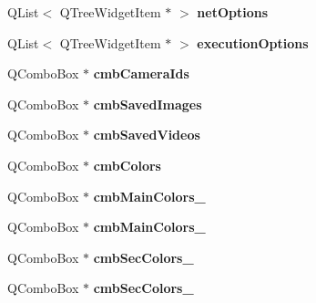 \begin{DoxyCompactItemize}
\item 
Q\+List$<$ Q\+Tree\+Widget\+Item $\ast$ $>$ {\bfseries net\+Options}\hypertarget{classMainWindow_abe03fbb5ec71af5ebe78e6d350ff8610}{}\label{classMainWindow_abe03fbb5ec71af5ebe78e6d350ff8610}

\item 
Q\+List$<$ Q\+Tree\+Widget\+Item $\ast$ $>$ {\bfseries execution\+Options}\hypertarget{classMainWindow_a07d591054dc439139f26228f13e08d16}{}\label{classMainWindow_a07d591054dc439139f26228f13e08d16}

\item 
Q\+Combo\+Box $\ast$ {\bfseries cmb\+Camera\+Ids}\hypertarget{classMainWindow_ab31fbf0f301d3b11b4f37acd22acae75}{}\label{classMainWindow_ab31fbf0f301d3b11b4f37acd22acae75}

\item 
Q\+Combo\+Box $\ast$ {\bfseries cmb\+Saved\+Images}\hypertarget{classMainWindow_a96ee34d39e2d213432dc10d7ebd451c4}{}\label{classMainWindow_a96ee34d39e2d213432dc10d7ebd451c4}

\item 
Q\+Combo\+Box $\ast$ {\bfseries cmb\+Saved\+Videos}\hypertarget{classMainWindow_a6b6645cb888879737675c47a5b1ef369}{}\label{classMainWindow_a6b6645cb888879737675c47a5b1ef369}

\item 
Q\+Combo\+Box $\ast$ {\bfseries cmb\+Colors}\hypertarget{classMainWindow_a258f6d51842841f42f9d0c263250cfd9}{}\label{classMainWindow_a258f6d51842841f42f9d0c263250cfd9}

\item 
Q\+Combo\+Box $\ast$ {\bfseries cmb\+Main\+Colors\+\_}\hypertarget{classMainWindow_a6163f0976b225e2b740e1bd299350eb6}{}\label{classMainWindow_a6163f0976b225e2b740e1bd299350eb6}

\item 
Q\+Combo\+Box $\ast$ {\bfseries cmb\+Main\+Colors\+\_}\hypertarget{classMainWindow_a00af65bd3f958b358c926ad4654dfd89}{}\label{classMainWindow_a00af65bd3f958b358c926ad4654dfd89}

\item 
Q\+Combo\+Box $\ast$ {\bfseries cmb\+Sec\+Colors\+\_}\hypertarget{classMainWindow_aef5e0a4b42892ed1a5e406561758abab}{}\label{classMainWindow_aef5e0a4b42892ed1a5e406561758abab}

\item 
Q\+Combo\+Box $\ast$ {\bfseries cmb\+Sec\+Colors\+\_}\hypertarget{classMainWindow_ac4755849feb4dcae10d7db15dfbb5f55}{}\label{classMainWindow_ac4755849feb4dcae10d7db15dfbb5f55}


\end{DoxyCompactItemize}
